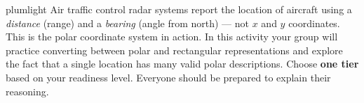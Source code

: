\documentclass[10pt]{article}
\begin{document}
\namepartnerperiod

\vspace{0.10in}

\begin{scenariobox}{plumlight}
Air traffic control radar systems report the location of aircraft using a
\emph{distance} (range) and a \emph{bearing} (angle from north) --- not $x$
and $y$ coordinates. This is the polar coordinate system in action. In this
activity your group will practice converting between polar and rectangular
representations and explore the fact that a single location has many valid
polar descriptions. Choose \textbf{one tier} based on your readiness level.
Everyone should be prepared to explain their reasoning.
\end{scenariobox}

\vspace{0.08in}
\end{document}
